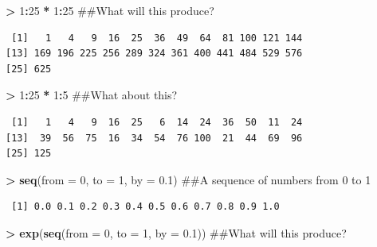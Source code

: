 \documentclass[]{krantz}
\makeatletter
\newenvironment{Shaded}{\begin{snugshade}}{\end{snugshade}}
\newcommand{\KeywordTok}[1]{\textcolor[rgb]{0.27,0.27,0.27}{\textbf{#1}}}
\newcommand{\DataTypeTok}[1]{\textcolor[rgb]{0.27,0.27,0.27}{#1}}
\newcommand{\DecValTok}[1]{\textcolor[rgb]{0.06,0.06,0.06}{#1}}
\newcommand{\FloatTok}[1]{\textcolor[rgb]{0.06,0.06,0.06}{#1}}
\newcommand{\StringTok}[1]{\textcolor[rgb]{0.5,0.5,0.5}{#1}}
\newcommand{\OperatorTok}[1]{\textcolor[rgb]{0.43,0.43,0.43}{\textbf{#1}}}
\newcommand{\NormalTok}[1]{#1}
\newenvironment{kframe}{%
\medskip{}
\setlength{\fboxsep}{.8em}
 \def\at@end@of@kframe{}%
 \ifinner\ifhmode%
  \def\at@end@of@kframe{\end{minipage}}%
  \begin{minipage}{\columnwidth}%
 \fi\fi%
 \def\FrameCommand##1{\hskip\@totalleftmargin \hskip-\fboxsep
 \colorbox{shadecolor}{##1}\hskip-\fboxsep
     \hskip-\linewidth \hskip-\@totalleftmargin \hskip\columnwidth}%
 \MakeFramed {\advance\hsize-\width
   \@totalleftmargin\z@ \linewidth\hsize
   \@setminipage}}%
 {\par\unskip\endMakeFramed%
 \at@end@of@kframe}
\renewenvironment{Shaded}{\begin{kframe}}{\end{kframe}}
\theoremstyle{definition}
\theoremstyle{definition}
\theoremstyle{definition}
\theoremstyle{remark}
\makeatother
\begin{document}
\begin{Shaded}
\begin{Highlighting}[]
\OperatorTok{>}\StringTok{ }\DecValTok{1}\OperatorTok{:}\DecValTok{25} \OperatorTok{*}\StringTok{ }\DecValTok{1}\OperatorTok{:}\DecValTok{25}\NormalTok{  ##What will this produce?}
\end{Highlighting}
\end{Shaded}

\begin{verbatim}
 [1]   1   4   9  16  25  36  49  64  81 100 121 144
[13] 169 196 225 256 289 324 361 400 441 484 529 576
[25] 625
\end{verbatim}

\begin{Shaded}
\begin{Highlighting}[]
\OperatorTok{>}\StringTok{ }\DecValTok{1}\OperatorTok{:}\DecValTok{25} \OperatorTok{*}\StringTok{ }\DecValTok{1}\OperatorTok{:}\DecValTok{5}\NormalTok{  ##What about this?}
\end{Highlighting}
\end{Shaded}

\begin{verbatim}
 [1]   1   4   9  16  25   6  14  24  36  50  11  24
[13]  39  56  75  16  34  54  76 100  21  44  69  96
[25] 125
\end{verbatim}

\begin{Shaded}
\begin{Highlighting}[]
\OperatorTok{>}\StringTok{ }\KeywordTok{seq}\NormalTok{(}\DataTypeTok{from =} \DecValTok{0}\NormalTok{, }\DataTypeTok{to =} \DecValTok{1}\NormalTok{, }\DataTypeTok{by =} \FloatTok{0.1}\NormalTok{)  ##A sequence of numbers from 0 to 1}
\end{Highlighting}
\end{Shaded}

\begin{verbatim}
 [1] 0.0 0.1 0.2 0.3 0.4 0.5 0.6 0.7 0.8 0.9 1.0
\end{verbatim}

\begin{Shaded}
\begin{Highlighting}[]
\OperatorTok{>}\StringTok{ }\KeywordTok{exp}\NormalTok{(}\KeywordTok{seq}\NormalTok{(}\DataTypeTok{from =} \DecValTok{0}\NormalTok{, }\DataTypeTok{to =} \DecValTok{1}\NormalTok{, }\DataTypeTok{by =} \FloatTok{0.1}\NormalTok{))  ##What will this produce?}
\end{Highlighting}
\end{Shaded}
\end{document}
